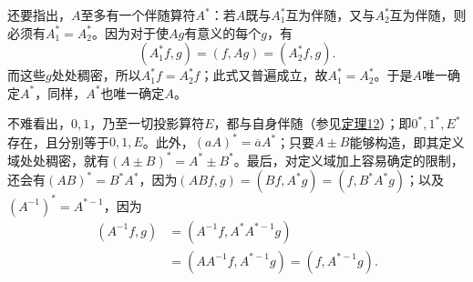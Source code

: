 \documentclass[fontsize=13pt,twoside,openany,headings=normal,parskip=false,bookmarkpackage=false,DIV=calc]{scrbook}
\begin{document}
还要指出，$A$至多有一个伴随算符$A^*$：若$A$既与$A_1^*$互为伴随，又与$A_2^*$互为伴随，则必须有$A_1^*=A_2^*$。因为对于使$Ag$有意义的每个$g$，有
\[
(A_1^*f,g)=(f,Ag)=(A_2^*f,g).
\]
而这些$g$处处稠密，所以$A_1^*f=A_2^*f$；此式又普遍成立，故$A_1^*=A_2^*$。于是$A$唯一确定$A^*$，同样，$A^*$也唯一确定$A$。

不难看出，$0,\allowbreak 1$，乃至一切投影算符$E$，都与自身伴随（参见\CJKglue \hyperref[thm:II.12]{定理12}）；即$0^*,\allowbreak 1^*,\allowbreak E^*$存在，且分别等于$0,\allowbreak 1,\allowbreak E$。此外，$(aA)^*=\overline aA^*$；只要$A\pm B$能够构造，即其定义域处处稠密，就有$(A\pm B)^*=A^*\pm B^*$。最后，对定义域加上容易确定的限制，还会有$(AB)^*=B^*A^*$，因为$(ABf,\allowbreak g)=(Bf,\allowbreak A^*g)=(f,\allowbreak B^*A^*g)$；以及$(A^{-1})^*=A^{*-1}$，因为
\begin{align*}
(A^{-1}f,g)&=(A^{-1}f,A^*A^{*-1}g)\\
&=(AA^{-1}f,A^{*-1}g)=(f,A^{*-1}g).
\end{align*}
\end{document}

